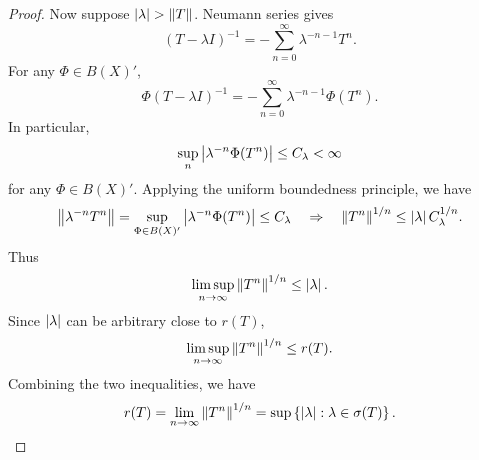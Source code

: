 \begin{proof}
    Now suppose $\left\lvert {\lambda} \right\rvert>\left\lVert {T} \right\rVert$. Neumann series gives 
    \begin{equation*}
        (T - \lambda I)^{-1} = -\sum_{n=0}^\infty \lambda^{-n-1}T^n.
    \end{equation*}
    For any $\Phi\in B(X)'$, 
    \begin{equation*}
        \Phi(T-\lambda I)^{-1} = -\sum_{n=0}^\infty \lambda^{-n-1}\Phi(T^n).
    \end{equation*}
    In particular, 
    \begin{equation*}
        \sup_{n} \left\lvert {\lambda^{-n}\Phi(T^n)} \right\rvert \leq C_\lambda < \infty
    \end{equation*}
    for any $\Phi\in B(X)'$. Applying the uniform boundedness principle, we have 
    \begin{equation*}
        \left\lVert {\lambda^{-n}T^n} \right\rVert = \sup_{\Phi\in B(X)'}\left\lvert {\lambda^{-n}\Phi(T^n)} \right\rvert 
        \leq C_\lambda \quad\Rightarrow\quad 
        \left\lVert {T^n} \right\rVert^{1/n} \leq \left\lvert {\lambda} \right\rvert C_\lambda^{1/n}.
    \end{equation*}
    Thus 
    \begin{equation*}
        \limsup_{n\to\infty}\left\lVert {T^n} \right\rVert^{1/n} \leq \left\lvert {\lambda} \right\rvert.
    \end{equation*}
    Since $\left\lvert {\lambda} \right\rvert$ can be arbitrary close to $r(T)$, 
    \begin{equation*}
        \limsup_{n\to\infty}\left\lVert {T^n} \right\rVert^{1/n} \leq r(T).
    \end{equation*}
    Combining the two inequalities, we have
    \begin{equation*}
        r(T) = \lim_{n\to\infty}\left\lVert {T^n} \right\rVert^{1/n} = \sup\left\{ {\left\lvert {\lambda} \right\rvert:\lambda\in\sigma(T)} \right\}.
    \end{equation*}
\end{proof}

